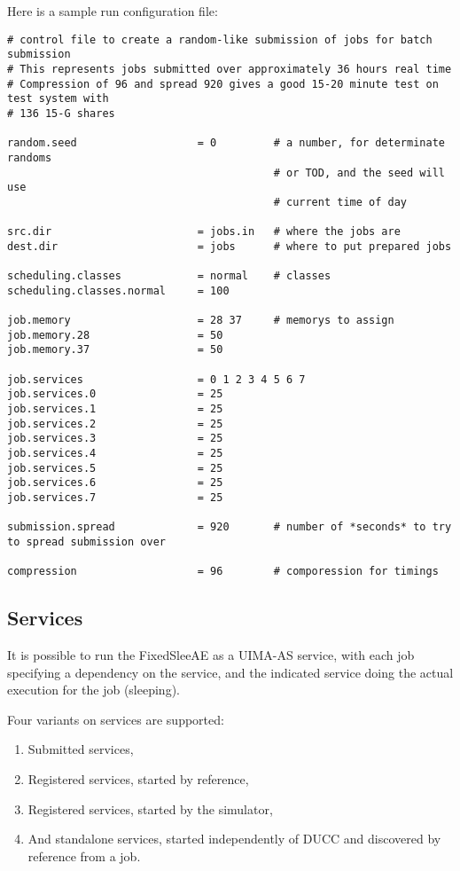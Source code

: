      Here is a sample run configuration file:
\begin{verbatim}
# control file to create a random-like submission of jobs for batch submission
# This represents jobs submitted over approximately 36 hours real time
# Compression of 96 and spread 920 gives a good 15-20 minute test on test system with
# 136 15-G shares

random.seed                   = 0         # a number, for determinate randoms
                                          # or TOD, and the seed will use
                                          # current time of day

src.dir                       = jobs.in   # where the jobs are
dest.dir                      = jobs      # where to put prepared jobs

scheduling.classes            = normal    # classes
scheduling.classes.normal     = 100

job.memory                    = 28 37     # memorys to assign
job.memory.28                 = 50
job.memory.37                 = 50

job.services                  = 0 1 2 3 4 5 6 7
job.services.0                = 25
job.services.1                = 25
job.services.2                = 25
job.services.3                = 25
job.services.4                = 25
job.services.5                = 25
job.services.6                = 25
job.services.7                = 25

submission.spread             = 920       # number of *seconds* to try to spread submission over 

compression                   = 96        # comporession for timings
\end{verbatim}
     
     \subsection{Services}
     \label{subsec:simulation.services}
     It is possible to run the FixedSleeAE as a UIMA-AS service, with each job
     specifying a dependency on the service, and the indicated service doing the
     actual execution for the job (sleeping).

     Four variants on services are supported:
     \begin{enumerate}
       \item Submitted services,
       \item Registered services, started by reference,
       \item Registered services, started by the simulator,
       \item And standalone services, started independently of DUCC and discovered
         by reference from a job.
     \end{enumerate}

